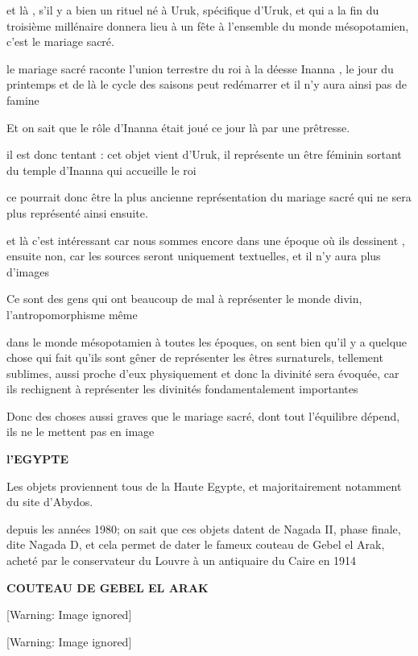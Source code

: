 \documentclass[a4paper,10pt]{article}
\newcommand{\DirImg}{../img/FaivreMartin/}
\begin{document}
et là , s'il y a bien un rituel né à Uruk, spécifique
d'Uruk, et qui a la fin du troisième millénaire
donnera lieu à un fête à l'ensemble du monde
mésopotamien, c'est le mariage sacré.

le mariage sacré  raconte l'union terrestre du roi à la
déesse Inanna , le jour du printemps et de là le cycle des saisons peut
redémarrer et il n'y aura ainsi pas de famine

Et on sait que le rôle d'Inanna était joué ce jour là
par une prêtresse.

il est donc tentant : cet objet vient d'Uruk, il
représente un être féminin sortant du temple d'Inanna
qui accueille le roi

ce pourrait donc être la plus ancienne représentation  du mariage sacré
qui ne sera plus représenté ainsi ensuite.

et là c'est intéressant car nous sommes encore dans une
époque où ils dessinent , ensuite non, car les sources seront
uniquement textuelles, et il n'y aura plus
d'images

Ce sont des gens qui ont beaucoup de mal à représenter le monde divin,
l'antropomorphisme même 

dans le monde mésopotamien  à toutes les époques,  on sent bien
qu'il y a quelque chose qui fait
qu'ils sont gêner de représenter les  êtres
surnaturels, tellement sublimes, aussi proche d'eux
physiquement et donc la divinité sera évoquée, car ils rechignent à
représenter les divinités fondamentalement importantes

Donc des choses aussi graves que le mariage sacré, dont tout
l'équilibre dépend, ils ne le mettent pas en image

\textbf{ l'EGYPTE}

Les objets proviennent tous de la Haute Egypte, et majoritairement
notamment du site d'Abydos.

depuis les années 1980; on sait que ces objets datent de Nagada II,
phase finale, dite Nagada D, et cela permet de dater le fameux couteau
de Gebel el Arak, acheté par le conservateur du Louvre à un antiquaire
du Caire en 1914

\textbf{COUTEAU DE GEBEL EL ARAK\ \ }

  [Warning: Image ignored] %
 

  [Warning: Image ignored] %
 
\end{document}
